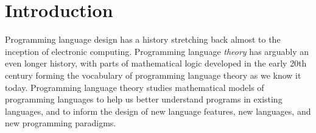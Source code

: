 \chapter{Introduction}

Programming language design has a history stretching back almost to the
inception of electronic computing.
Programming language \emph{theory} has arguably an even longer history, with
parts of mathematical logic developed in the early 20th century forming the
vocabulary of programming language theory as we know it today.
Programming language theory studies mathematical models of programming languages
to help us better understand programs in existing languages, and to inform the
design of new language features, new languages, and new programming paradigms.




